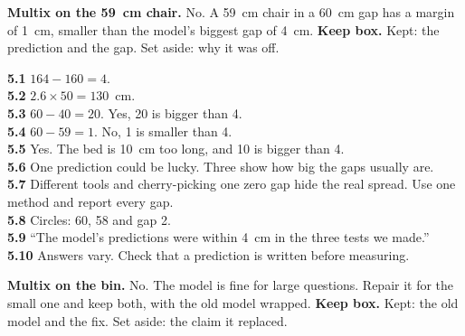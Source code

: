 \textbf{Multix on the 59~cm chair.} No. A 59~cm chair in a 60~cm gap has a margin of 1~cm, smaller than the model's biggest gap of 4~cm. \textbf{Keep box.} Kept: the prediction and the gap. Set aside: why it was off.

\textbf{5.1} $164-160=4$.\\
\textbf{5.2} $2.6\times50=130$~cm.\\
\textbf{5.3} $60-40=20$. Yes, 20 is bigger than 4.\\
\textbf{5.4} $60-59=1$. No, 1 is smaller than 4.\\
\textbf{5.5} Yes. The bed is 10~cm too long, and 10 is bigger than 4.\\
\textbf{5.6} One prediction could be lucky. Three show how big the gaps usually are.\\
\textbf{5.7} Different tools and cherry-picking one zero gap hide the real spread. Use one method and report every gap.\\
\textbf{5.8} Circles: 60, 58 and gap 2.\\
\textbf{5.9} ``The model's predictions were within 4~cm in the three tests we made.''\\
\textbf{5.10} Answers vary. Check that a prediction is written before measuring.

\textbf{Multix on the bin.} No. The model is fine for large questions. Repair it for the small one and keep both, with the old model wrapped. \textbf{Keep box.} Kept: the old model and the fix. Set aside: the claim it replaced.

